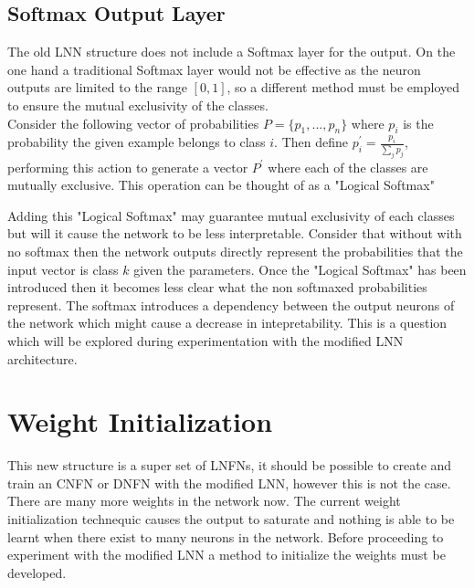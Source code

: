 \subsection{Softmax Output Layer}
The old LNN structure does not include a Softmax layer for the output. On the one hand a traditional Softmax layer would not be effective as the neuron outputs are limited to the range $[0,1]$, so a different method must be employed to ensure the mutual exclusivity of the classes.\\

Consider the following vector of probabilities $P = \{p_1, ..., p_n\}$ where $p_i$ is the probability the given example belongs to class $i$. Then define $p_i^{'} = \frac{p_i}{\sum_j p_j}$, performing this action to generate a vector $P^{'}$ where each of the classes are mutually exclusive. This operation can be thought of as a "Logical Softmax"

Adding this "Logical Softmax" may guarantee mutual exclusivity of each classes but will it cause the network to be less interpretable. Consider that without with no softmax then the network outputs directly represent the probabilities that the input vector is class $k$ given the parameters. Once the "Logical Softmax" has been introduced then it becomes less clear what the non softmaxed probabilities represent. The softmax introduces a dependency between the output neurons of the network which might cause a decrease in intepretability. This is a question which will be explored during experimentation with the modified LNN architecture.



\section{Weight Initialization}

This new structure is a super set of LNFNs, it should be possible to create and train an CNFN or DNFN with the modified LNN, however this is not the case. There are many more weights in the network now. The current weight initialization technequic causes the output to saturate and nothing is able to be learnt when there exist to many neurons in the network. Before proceeding to experiment with the modified LNN a method to initialize the weights must be developed.\\


